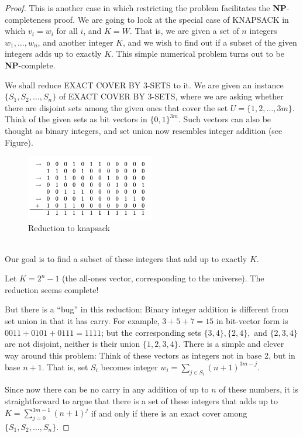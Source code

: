 \documentclass[12pt]{article}
\begin{document}
\begin{proof}
  This is another case in which restricting the problem facilitates the \textbf{NP}-completeness proof. We are going to look at the special case of \textsc{KNAPSACK} in which $v_i = w_i$ for all $i$, and $K = W$. That is, we are given a set of $n$ integers $w_1, \ldots, w_n$, and another integer $K$, and we wish to find out if a subset of the given integers adds up to exactly $K$. This simple numerical problem turns out to be \textbf{NP}-complete.

We shall reduce \textsc{EXACT COVER BY 3-SETS} to it. We are given an instance $\{S_1, S_2, \ldots, S_n\}$ of \textsc{EXACT COVER BY 3-SETS}, where we are asking whether there are disjoint sets among the given ones that cover the set $U = \{1, 2, \ldots, 3m\}$. Think of the given sets as bit vectors in $\{0, 1\}^{3m}$. Such vectors can also be thought as binary integers, and set union now resembles integer addition (see Figure).
\begin{figure}[h]
  \centering
  \includegraphics[width=0.5\textwidth]{img/knapsack.png}
  \caption{Reduction to knapsack}
\end{figure}
\\
 Our goal is to find a subset of these integers that add up to exactly $K$.

Let $K = 2^n - 1$ (the all-ones vector, corresponding to the universe). The reduction seems complete!

But there is a ``bug'' in this reduction: Binary integer addition is different from set union in that it has carry. For example, $3 + 5 + 7 = 15$ in bit-vector form is $0011 + 0101 + 0111 = 1111$; but the corresponding sets $\{3, 4\}, \{2, 4\},$ and $\{2, 3, 4\}$ are not disjoint, neither is their union $\{1, 2, 3, 4\}$. There is a simple and clever way around this problem: Think of these vectors as integers not in base 2, but in base $n + 1$. That is, set $S_i$ becomes integer $w_i = \sum_{j \in S_i} (n + 1)^{3m-j}$. 

Since now there can be no carry in any addition of up to $n$ of these numbers, it is straightforward to argue that there is a set of these integers that adds up to $K = \sum_{j=0}^{3m-1} (n + 1)^j$ if and only if there is an exact cover among $\{S_1, S_2, \ldots, S_n\}$. 
\end{proof}
\end{document}
